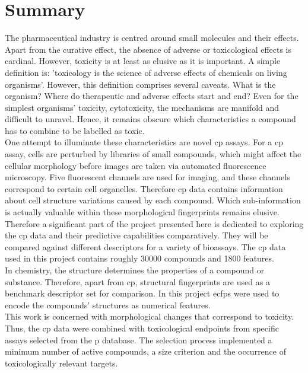 \chapter{Summary}\label{sec:summary}
The pharmaceutical industry is centred around small molecules and their effects. Apart from the curative effect, the absence of adverse or toxicological effects is cardinal. However, toxicity is at least as elusive as it is important. A simple definition is: 'toxicology is the science of adverse effects of chemicals on living organisms'.\cite{Singh2018} However, this definition comprises several caveats. What is the organism? Where do therapeutic and adverse effects start and end? Even for the simplest organisms' toxicity, cytotoxicity, the mechanisms are manifold and difficult to unravel. Hence, it remains obscure which characteristics a compound has to combine to be labelled as toxic.\\
One attempt to illuminate these characteristics are novel \ac{cp} assays. For a \ac{cp} assay, cells are perturbed by libraries of small compounds, which might affect the cellular morphology before images are taken via automated fluorescence microscopy. Five fluorescent channels are used for imaging, and these channels correspond to certain cell organelles\cite{Carpenter2006}. Therefore \ac{cp} data contains information about cell structure variations caused by each compound. Which sub-information is actually valuable within these morphological fingerprints remains elusive. Therefore a significant part of the project presented here is dedicated to exploring the \ac{cp} data and their predictive capabilities comparatively. They will be compared against different descriptors for a variety of bioassays. The \ac{cp} data used in this project contains roughly \num{30000} compounds and \num{1800} features.\cite{Bray2017}\\
In chemistry, the structure determines the properties of a compound or substance. Therefore, apart from \ac{cp}, structural fingerprints are used as a benchmark descriptor set for comparison. In this project \acp{ecfp} were used to encode the compounds' structures as numerical features.\\
This work is concerned with morphological changes that correspond to toxicity. Thus, the \ac{cp} data were combined with toxicological endpoints from specific assays selected from the \acl{p} database. The selection process implemented a minimum number of active compounds, a size criterion and the occurrence of toxicologically relevant targets.\cite{Mervin2016}\\
